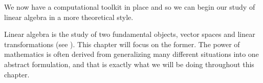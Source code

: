 We now have a computational toolkit in place and so we can begin our study of linear algebra in a more theoretical style.\par
%
Linear algebra is the study of two fundamental objects, vector spaces and linear transformations (see ).  This chapter will focus on the former.  The power of mathematics is often derived from generalizing many different situations into one abstract formulation, and that is exactly what we will be doing throughout this chapter.
